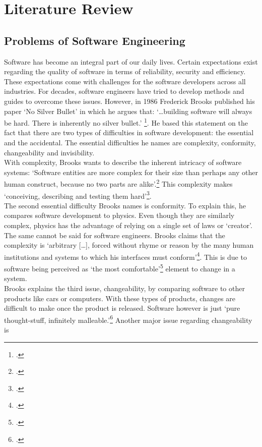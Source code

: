 \section{Literature Review}
\subsection{Problems of Software Engineering}
Software has become an integral part of our daily lives. Certain expectations exist regarding the quality of software in terms of reliability, security and efficiency. These expectations come with challenges for the software developers across all industries.
For decades, software engineers have tried to develop methods and guides to overcome these issues. However, in 1986 Frederick Brooks published his paper `No Silver Bullet'
in which he argues that: `\ldots building software will always be hard. There is inherently no silver bullet.' \footcite[3]{brooksNoSilverBullet1987}. He based this statement on the fact that there are two types of difficulties in software development: the essential and the accidental.
The essential difficulties he names are complexity, conformity, changeability and invisibility.\\
With complexity, Brooks wants to describe the inherent intricacy of software systems: `Software entities are more complex for their size than perhaps any other human construct, because no two parts are alike'.\footcite[3]{brooksNoSilverBullet1987}
This complexity makes `conceiving, describing and testing them hard'\footcite[3]{brooksNoSilverBullet1987}.\\
The second essential difficulty Brooks names is conformity. To explain this, he compares software development to physics. Even though they are similarly complex, physics has the advantage of relying on a single set of laws or `creator'. The same cannot be said for software engineers. Brooks claims that
the complexity is `arbitrary [\ldots], forced without rhyme or reason by the many human institutions and systems to which his interfaces must conform'\footcite[4]{brooksNoSilverBullet1987}. This is due to software being perceived as `the most comfortable'\footcite[4]{brooksNoSilverBullet1987} element to change in a system.\\
Brooks explains the third issue, changeability, by comparing software to other products like cars or computers. With these types of products, changes are difficult to make once the product is released. Software however is just `pure thought-stuff, infinitely malleable.'\footcite[4]{brooksNoSilverBullet1987} Another major issue regarding changeability is
